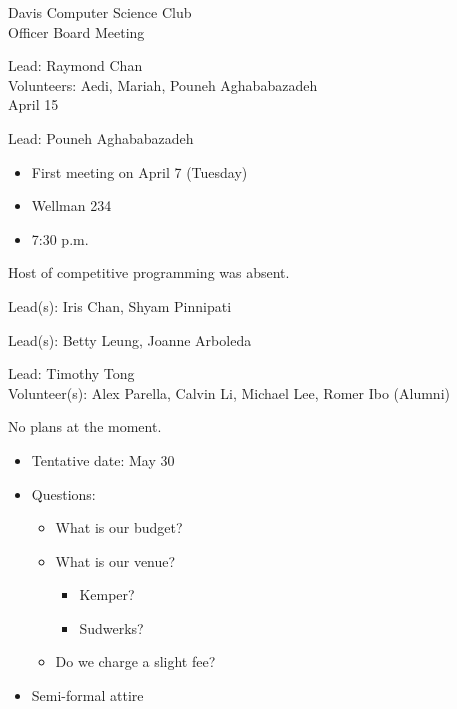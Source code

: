\documentclass{article}
\begin{document}
\begin{Minutes}{Davis Computer Science Club\\Officer Board Meeting}

Lead: Raymond Chan\\
Volunteers: Aedi, Mariah, Pouneh Aghababazadeh\\
April 15\\



Lead: Pouneh Aghababazadeh

\begin{itemize}
	\item First meeting on April 7 (Tuesday)
	\item Wellman 234
	\item 7:30 p.m.
\end{itemize}


Host of competitive programming was absent.


Lead(s): Iris Chan, Shyam Pinnipati\\



Lead(s): Betty Leung, Joanne Arboleda\\



Lead: Timothy Tong\\
Volunteer(s): Alex Parella, Calvin Li, Michael Lee, Romer Ibo (Alumni)\\



No plans at the moment.


\begin{itemize}
	\item Tentative date: May 30
	\item Questions:
	\begin{itemize}
		\item What is our budget?
		\item What is our venue?
		\begin{itemize}
			\item Kemper?
			\item Sudwerks?
		\end{itemize}
		\item Do we charge a slight fee?
	\end{itemize}
	\item Semi-formal attire
\end{itemize}


\end{Minutes}
\end{document}
